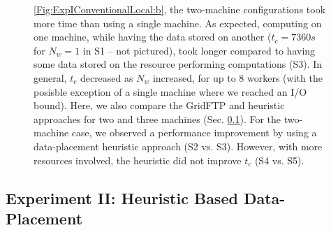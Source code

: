 \documentclass{rspublic}
\newcommand{\fixme}[1]{ { \bf{ ***FIXME: #1
}} } \newcommand{\jhanote}[1]{ {\textcolor{red} { ***Jha: #1 }}}
\newcommand{\micnote}[1]{ {\textcolor{blue} { ***Michael: #1 }}}
\newcommand{\betynote}[1]{ {\textcolor{orange} { ***Bety: #1 }}}
\newcommand{\jhanote}[1]{} \newcommand{\micnote}[1]{}\newcommand{\betynote}[1]{} \newcommand{\fixme}[1]{}
\begin{document}
\begin{figure}[!ht]
\begin{center}
{  \ref{Fig:ExpIConventionalLocal:b}, the two-machine configurations
  took more time than using a single machine. As expected, computing
  on one machine, while having the data stored on another ($t_c=7360s$
  for $N_w=1$ in S1 -- not pictured), took longer compared to having
  some data stored on the resource performing computations (S3). In
  general, $t_c$ decreased as $N_w$ increased, for up to 8 workers
  (with the posisble exception of a single machine where we reached an
  I/O bound). Here, we also compare the GridFTP and heuristic
  approaches for two and three machines
  (Sec. \ref{Sec:Heuristic}). For the two-machine case, we observed a
  performance improvement by using a data-placement heuristic approach
  (S2 vs. S3). However, with more resources involved, the heuristic
  did not improve $t_c$ (S4 vs. S5).}
\label{Fig:ExpIConventionalLocal}
\end{center}
\vspace{-0.3cm}
\end{figure}





\vspace{-0.4cm}

\subsection{Experiment II: Heuristic Based Data-Placement}\label{Sec:Heuristic}

\vspace{-0.1cm}
\end{document}
